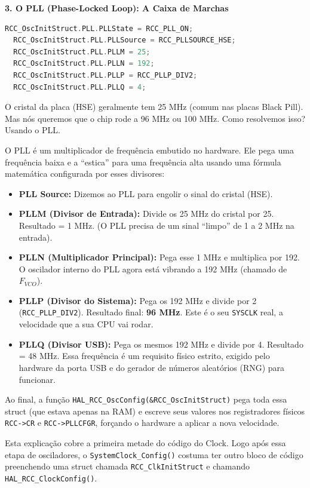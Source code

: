 \documentclass[12pt,a4paper]{article}
\begin{document}
\vspace{0.3cm}
\noindent\textbf{3. O PLL (Phase-Locked Loop): A Caixa de Marchas}
\begin{lstlisting}[language=C]
  RCC_OscInitStruct.PLL.PLLState = RCC_PLL_ON;
  RCC_OscInitStruct.PLL.PLLSource = RCC_PLLSOURCE_HSE;
  RCC_OscInitStruct.PLL.PLLM = 25;
  RCC_OscInitStruct.PLL.PLLN = 192;
  RCC_OscInitStruct.PLL.PLLP = RCC_PLLP_DIV2;
  RCC_OscInitStruct.PLL.PLLQ = 4;
\end{lstlisting}

O cristal da placa (HSE) geralmente tem 25 MHz (comum nas placas Black Pill). Mas nós queremos que o chip rode a 96 MHz ou 100 MHz. Como resolvemos isso? Usando o PLL.

O PLL é um multiplicador de frequência embutido no hardware. Ele pega uma frequência baixa e a ``estica'' para uma frequência alta usando uma fórmula matemática configurada por esses divisores:
\begin{itemize}
    \item \textbf{PLL Source:} Dizemos ao PLL para engolir o sinal do cristal (HSE).
    \item \textbf{PLLM (Divisor de Entrada):} Divide os 25 MHz do cristal por 25. Resultado = 1 MHz. (O PLL precisa de um sinal ``limpo'' de 1 a 2 MHz na entrada).
    \item \textbf{PLLN (Multiplicador Principal):} Pega esse 1 MHz e multiplica por 192. O oscilador interno do PLL agora está vibrando a 192 MHz (chamado de $F_{VCO}$).
    \item \textbf{PLLP (Divisor do Sistema):} Pega os 192 MHz e divide por 2 (\texttt{RCC\_PLLP\_DIV2}). Resultado final: \textbf{96 MHz}. Este é o seu \texttt{SYSCLK} real, a velocidade que a sua CPU vai rodar.
    \item \textbf{PLLQ (Divisor USB):} Pega os mesmos 192 MHz e divide por 4. Resultado = 48 MHz. Essa frequência é um requisito físico estrito, exigido pelo hardware da porta USB e do gerador de números aleatórios (RNG) para funcionar.
\end{itemize}

Ao final, a função \texttt{HAL\_RCC\_OscConfig(\&RCC\_OscInitStruct)} pega toda essa struct (que estava apenas na RAM) e escreve seus valores nos registradores físicos \texttt{RCC->CR} e \texttt{RCC->PLLCFGR}, forçando o hardware a aplicar a nova velocidade.

Esta explicação cobre a primeira metade do código do Clock. Logo após essa etapa de osciladores, o \texttt{SystemClock\_Config()} costuma ter outro bloco de código preenchendo uma struct chamada \texttt{RCC\_ClkInitStruct} e chamando \texttt{HAL\_RCC\_ClockConfig()}.
\end{document}
